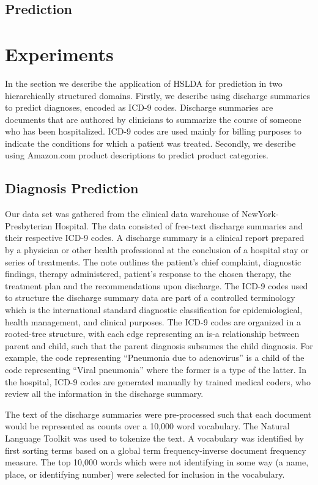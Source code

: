 \documentclass{article}
\begin{document}
\subsection{Prediction}

\section{Experiments}

In the section we describe the application of HSLDA for prediction
in two hierarchically structured domains. Firstly, we describe using
discharge summaries to predict diagnoses, encoded as ICD-9 codes.
Discharge summaries are documents that are authored by clinicians
to summarize the course of someone who has been hospitalized. ICD-9
codes are used mainly for billing purposes to indicate the conditions
for which a patient was treated. Secondly, we describe using Amazon.com
product descriptions to predict product categories.


\subsection{Diagnosis Prediction}

Our data set was gathered from the clinical data warehouse of NewYork-Presbyterian
Hospital. The data consisted of free-text discharge summaries and
their respective ICD-9 codes. A discharge summary is a clinical report
prepared by a physician or other health professional at the conclusion
of a hospital stay or series of treatments. The note outlines the
patient's chief complaint, diagnostic findings, therapy administered,
patient's response to the chosen therapy, the treatment plan and
the recommendations upon discharge. The ICD-9 codes used to structure
the discharge summary data are part of a controlled terminology which
is the international standard diagnostic classification for epidemiological,
health management, and clinical purposes. The ICD-9 codes are organized
in a rooted-tree structure, with each edge representing an is-a relationship
between parent and child, such that the parent diagnosis subsumes
the child diagnosis. For example, the code representing {}``Pneumonia
due to adenovirus'' is a child of the code representing {}``Viral
pneumonia'' where the former is a type of the latter. In the hospital,
ICD-9 codes are generated manually by trained medical coders, who
review all the information in the discharge summary.

The text of the discharge summaries were pre-processed such that each
document would be represented as counts over a 10,000 word vocabulary.
The Natural Language Toolkit was used to tokenize the text. A vocabulary
was identified by first sorting terms based on a global term frequency-inverse
document frequency measure. The top 10,000 words which were not identifying
in some way (a name, place, or identifying number) were selected for
inclusion in the vocabulary.
\end{document}
